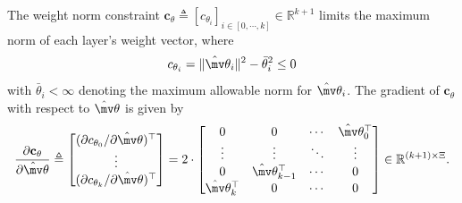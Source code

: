 \documentclass[lettersize,journal]{IEEEtran}
\newcommand*{\wth}{\mv\theta}
\begin{document}
The weight norm constraint $\mathbf{c}_{\theta}\triangleq [c_{\theta_i}]_{i\in[0,\cdots ,k]}\in\mathbb R^{k+1}$ limits the maximum norm of each layer's weight vector, where
\begin{equation}
    c_{\theta_i}
    =
    \Vert \hat\wth_i\Vert^2 
    -
    \bar\theta_i^2 \le 0
    \label{eq. cstr weight ball}
\end{equation}
with $\bar\theta_i<\infty$ denoting the maximum allowable norm for $\hat\wth_i$. 
The gradient of $\mathbf{c}_\theta$ with respect to $\hat\wth$ is given by
\begin{equation}\label{eq weight norm cnst grad}
    {\partial \mathbf c_\theta \over \partial \hat\wth}
    \triangleq
    \begin{bmatrix}
        (\partial c_{\theta_0}/\partial \hat\wth)^\top
        \\ 
        \vdots 
        \\
        (\partial c_{\theta_k}/\partial \hat\wth)^\top
    \end{bmatrix}
    = 2\cdot 
    \begin{bmatrix}
        0&0&\cdots & \hat\wth_0^\top\\
        \vdots&\vdots&\ddots&\vdots\\
        0&\hat\wth^\top_{k-1}&\cdots &0\\
        \hat\wth^\top_k&0&\cdots &0
    \end{bmatrix}
    \in\mathbb R^{(k+1)\times\Xi}
    .
\end{equation}

\end{document}
